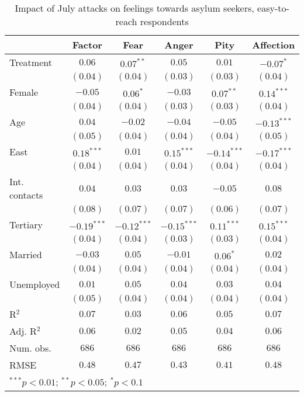
\begin{table}
\caption{Impact of July attacks on feelings towards asylum seekers, easy-to-reach respondents}
\begin{center}
\begin{tabular}{l c c c c c}
\toprule
 & Factor & Fear & Anger & Pity & Affection \\
\midrule
Treatment     & $0.06$        & $0.07^{**}$   & $0.05$        & $0.01$        & $-0.07^{*}$   \\
              & $(0.04)$      & $(0.04)$      & $(0.03)$      & $(0.03)$      & $(0.04)$      \\
Female        & $-0.05$       & $0.06^{*}$    & $-0.03$       & $0.07^{**}$   & $0.14^{***}$  \\
              & $(0.04)$      & $(0.04)$      & $(0.03)$      & $(0.03)$      & $(0.04)$      \\
Age           & $0.04$        & $-0.02$       & $-0.04$       & $-0.05$       & $-0.13^{***}$ \\
              & $(0.05)$      & $(0.04)$      & $(0.04)$      & $(0.04)$      & $(0.05)$      \\
East          & $0.18^{***}$  & $0.01$        & $0.15^{***}$  & $-0.14^{***}$ & $-0.17^{***}$ \\
              & $(0.04)$      & $(0.04)$      & $(0.04)$      & $(0.04)$      & $(0.04)$      \\
Int. contacts & $0.04$        & $0.03$        & $0.03$        & $-0.05$       & $0.08$        \\
              & $(0.08)$      & $(0.07)$      & $(0.07)$      & $(0.06)$      & $(0.07)$      \\
Tertiary      & $-0.19^{***}$ & $-0.12^{***}$ & $-0.15^{***}$ & $0.11^{***}$  & $0.15^{***}$  \\
              & $(0.04)$      & $(0.04)$      & $(0.03)$      & $(0.03)$      & $(0.04)$      \\
Married       & $-0.03$       & $0.05$        & $-0.01$       & $0.06^{*}$    & $0.02$        \\
              & $(0.04)$      & $(0.04)$      & $(0.04)$      & $(0.04)$      & $(0.04)$      \\
Unemployed    & $0.01$        & $0.05$        & $0.04$        & $0.03$        & $0.04$        \\
              & $(0.05)$      & $(0.04)$      & $(0.04)$      & $(0.04)$      & $(0.04)$      \\
\midrule
R$^2$         & $0.07$        & $0.03$        & $0.06$        & $0.05$        & $0.07$        \\
Adj. R$^2$    & $0.06$        & $0.02$        & $0.05$        & $0.04$        & $0.06$        \\
Num. obs.     & $686$         & $686$         & $686$         & $686$         & $686$         \\
RMSE          & $0.48$        & $0.47$        & $0.43$        & $0.41$        & $0.48$        \\
\bottomrule
\multicolumn{6}{l}{\scriptsize{$^{***}p<0.01$; $^{**}p<0.05$; $^{*}p<0.1$}}
\end{tabular}
\label{tab_emo_reach}
\end{center}
\end{table}
